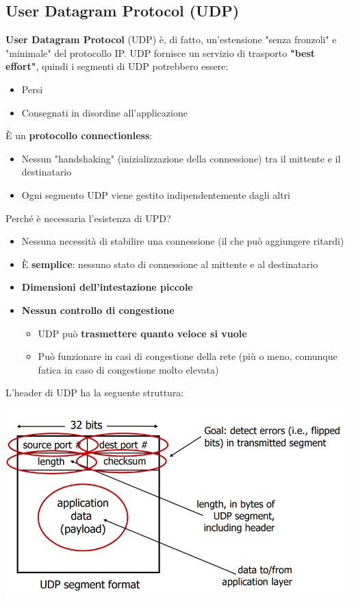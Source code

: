 \documentclass[12pt]{article}
\begin{document}
\subsection{User Datagram Protocol (UDP)}
\textbf{User Datagram Protocol} (UDP) è, di fatto, un'estensione "senza fronzoli" e "minimale" del protocollo IP.
UDP fornisce un servizio di trasporto \textbf{"best effort"}, quindi i segmenti di UDP potrebbero essere:
\begin{itemize}
    \item Persi 
    \item Consegnati in disordine all'applicazione
\end{itemize}
È un \textbf{protocollo connectionless}:
\begin{itemize}
    \item Nessun "handshaking" (inizializzazione della connessione) tra il mittente e il destinatario
    \item Ogni segmento UDP viene gestito indipendentemente dagli altri
\end{itemize}
Perché è necessaria l'esistenza  di UPD?
\begin{itemize}
    \item Nessuna necessità di stabilire una connessione (il che può aggiungere ritardi)
    \item È \textbf{semplice}: nessuno stato di connessione al mittente e al destinatario
    \item \textbf{Dimensioni dell'intestazione piccole}
    \item \textbf{Nessun controllo di congestione}
    \begin{itemize}
        \item UDP può \textbf{trasmettere quanto veloce si vuole}
        \item Può funzionare in casi di congestione della rete (più o meno, comunque fatica in caso di congestione molto elevata)
    \end{itemize}
\end{itemize}
L'header di UDP ha la seguente struttura:
\begin{center}
    \includegraphics[width = 0.80\linewidth]{Images/43.png}
\end{center}
\end{document}
